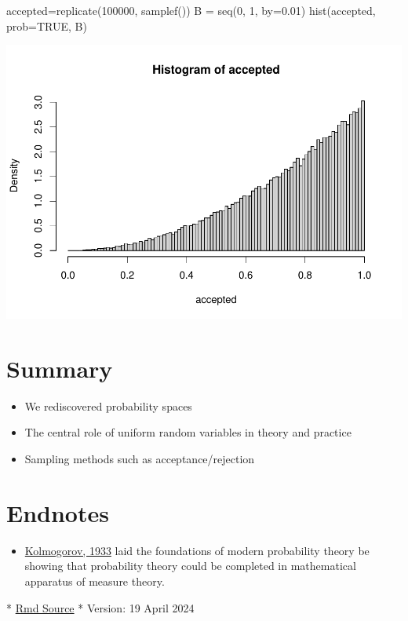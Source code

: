 \documentclass[
]{article}
\newenvironment{Shaded}{\begin{snugshade}}{\end{snugshade}}
\newcommand{\AttributeTok}[1]{\textcolor[rgb]{0.77,0.63,0.00}{#1}}
\newcommand{\ConstantTok}[1]{\textcolor[rgb]{0.00,0.00,0.00}{#1}}
\newcommand{\DecValTok}[1]{\textcolor[rgb]{0.00,0.00,0.81}{#1}}
\newcommand{\FloatTok}[1]{\textcolor[rgb]{0.00,0.00,0.81}{#1}}
\newcommand{\FunctionTok}[1]{\textcolor[rgb]{0.00,0.00,0.00}{#1}}
\newcommand{\NormalTok}[1]{#1}
\newcommand{\OtherTok}[1]{\textcolor[rgb]{0.56,0.35,0.01}{#1}}
\providecommand{\tightlist}{%
  \setlength{\itemsep}{0pt}\setlength{\parskip}{0pt}}
\theoremstyle{definition}
\theoremstyle{definition}
\theoremstyle{definition}
\theoremstyle{definition}
\theoremstyle{remark}
\begin{document}
\begin{Shaded}
\begin{Highlighting}[]
\NormalTok{accepted}\OtherTok{=}\FunctionTok{replicate}\NormalTok{(}\DecValTok{100000}\NormalTok{, }\FunctionTok{samplef}\NormalTok{())}
\NormalTok{B }\OtherTok{=} \FunctionTok{seq}\NormalTok{(}\DecValTok{0}\NormalTok{, }\DecValTok{1}\NormalTok{, }\AttributeTok{by=}\FloatTok{0.01}\NormalTok{)}
\FunctionTok{hist}\NormalTok{(accepted, }\AttributeTok{prob=}\ConstantTok{TRUE}\NormalTok{, B)}
\end{Highlighting}
\end{Shaded}

\includegraphics{randomTP_files/figure-latex/unnamed-chunk-5-1.pdf}

\hypertarget{summary}{%
\section{Summary}\label{summary}}

\begin{itemize}
\tightlist
\item
  We rediscovered probability spaces
\item
  The central role of uniform random variables in theory and practice
\item
  Sampling methods such as acceptance/rejection
\end{itemize}

\hypertarget{endnotes}{%
\section{Endnotes}\label{endnotes}}

\begin{itemize}
\tightlist
\item
  \href{https://dn790007.ca.archive.org/0/items/foundationsofthe00kolm/foundationsofthe00kolm.pdf}{Kolmogorov, 1933} laid the foundations of modern probability theory be showing that probability theory could be completed in mathematical apparatus of measure theory.
\end{itemize}

* \href{https://tsoo-math.github.io/ucl/randomTP.Rmd}{Rmd Source}
* Version: 19 April 2024
\end{document}
